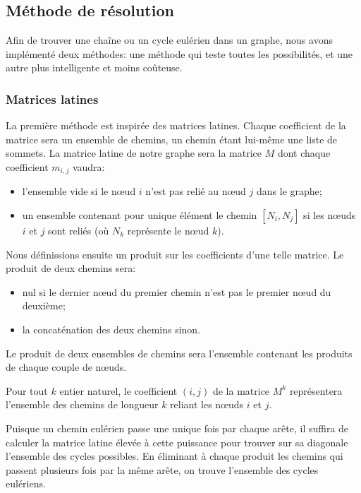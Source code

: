 \documentclass{scrartcl}
\begin{document}
  \subsection{Méthode de résolution}
    Afin de trouver une chaîne ou un cycle eulérien dans un graphe, nous avons
    implémenté deux méthodes: une méthode qui teste toutes les possibilités,
    et une autre plus intelligente et moins coûteuse.

    \subsubsection{Matrices latines}
      La première méthode est inspirée des matrices latines. Chaque coefficient
      de la matrice sera un ensemble de chemins, un chemin étant lui-même une
      liste de sommets. La matrice latine de notre graphe sera la matrice $M$
      dont chaque coefficient $m_{i,j}$ vaudra:
      \begin{itemize}
        \item l'ensemble vide si le nœud $i$ n'est pas relié au nœud $j$ dans
          le graphe;
        \item un ensemble contenant pour unique élément le chemin $[N_i,N_j]$
          si les nœuds $i$ et $j$ sont reliés (où $N_k$ représente le nœud
          $k$).
      \end{itemize}

      Nous définissions ensuite un produit sur les coefficients d'une telle
      matrice. Le produit de deux chemins sera:
      \begin{itemize}
        \item nul si le dernier nœud du premier chemin n'est pas le premier
          nœud du deuxième;
        \item la concaténation des deux chemins sinon.
      \end{itemize}

      Le produit de deux ensembles de chemins sera l'ensemble contenant les
      produits de chaque couple de nœuds.

      Pour tout $k$ entier naturel, le coefficient $(i,j)$ de la matrice $M^k$
      représentera l'ensemble des chemins de longueur $k$ reliant les nœuds $i$
      et $j$.
      
      Puisque un chemin eulérien passe une unique fois par chaque arête, il
      suffira de calculer la matrice latine élevée à cette puissance pour
      trouver sur sa diagonale l'ensemble des cycles possibles. En éliminant à
      chaque produit les chemins qui passent plusieurs fois par la même arête,
      on trouve l'ensemble des cycles eulériens.
\end{document}
